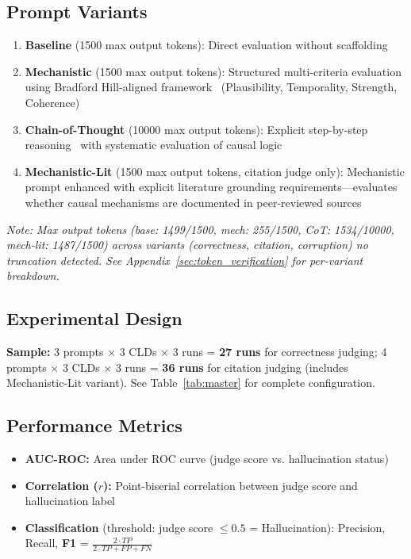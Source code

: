 \subsection{Prompt Variants}
\begin{enumerate}[noitemsep]
    \item \textbf{Baseline} (1500 max output tokens): Direct evaluation without scaffolding
    \item \textbf{Mechanistic} (1500 max output tokens): Structured multi-criteria evaluation using Bradford Hill-aligned framework~\cite{shimonovich2020bradford} (Plausibility, Temporality, Strength, Coherence)
    \item \textbf{Chain-of-Thought} (10000 max output tokens): Explicit step-by-step reasoning~\cite{kojima2022large} with systematic evaluation of causal logic
    \item \textbf{Mechanistic-Lit} (1500 max output tokens, citation judge only): Mechanistic prompt enhanced with explicit literature grounding requirements---evaluates whether causal mechanisms are documented in peer-reviewed sources
\end{enumerate}

\textit{Note: Max output tokens (base: 1499/1500, mech: 255/1500, CoT: 1534/10000, mech-lit: 1487/1500) across variants (correctness, citation, corruption) no truncation detected. See Appendix~\ref{sec:token_verification} for per-variant breakdown.}

\subsection{Experimental Design}
\textbf{Sample:} 3 prompts $\times$ 3 CLDs $\times$ 3 runs = \textbf{27 runs} for correctness judging; 4 prompts $\times$ 3 CLDs $\times$ 3 runs = \textbf{36 runs} for citation judging (includes Mechanistic-Lit variant). See Table~\ref{tab:master} for complete configuration.

\subsection{Performance Metrics}
\begin{itemize}[noitemsep]
    \item \textbf{AUC-ROC:} Area under ROC curve (judge score vs. hallucination status)
    \item \textbf{Correlation ($r$):} Point-biserial correlation between judge score and hallucination label
    \item \textbf{Classification} (threshold: judge score $\leq 0.5$ = Hallucination): Precision, Recall, \textbf{F1} = $\frac{2 \cdot TP}{2 \cdot TP + FP + FN}$
\end{itemize}

